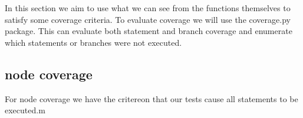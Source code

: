 In this section we aim to use what we can see from the functions themselves to satisfy some coverage
criteria. To evaluate coverage we will use the coverage.py package. This can evaluate both statement and branch coverage and enumerate which statements or branches were not executed.

\subsection{node coverage}


For node coverage we have the critereon that our tests cause all statements to be executed.m

